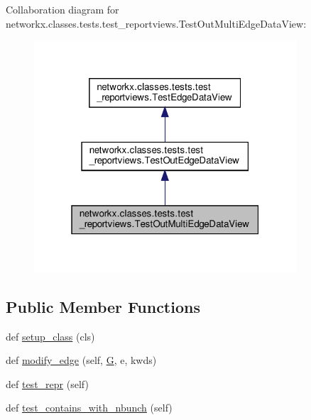 Collaboration diagram for networkx.\+classes.\+tests.\+test\+\_\+reportviews.\+Test\+Out\+Multi\+Edge\+Data\+View\+:
\nopagebreak
\begin{figure}[H]
\begin{center}
\leavevmode
\includegraphics[width=277pt]{classnetworkx_1_1classes_1_1tests_1_1test__reportviews_1_1TestOutMultiEdgeDataView__coll__graph}
\end{center}
\end{figure}
\subsection*{Public Member Functions}
\begin{DoxyCompactItemize}
\item 
def \hyperlink{classnetworkx_1_1classes_1_1tests_1_1test__reportviews_1_1TestOutMultiEdgeDataView_a45eb1b929a4416e8a45773122f7e4fe1}{setup\+\_\+class} (cls)
\item 
def \hyperlink{classnetworkx_1_1classes_1_1tests_1_1test__reportviews_1_1TestOutMultiEdgeDataView_ae1ee5acb335b86a3b3ff0a81222b2686}{modify\+\_\+edge} (self, \hyperlink{classnetworkx_1_1classes_1_1tests_1_1test__reportviews_1_1TestOutMultiEdgeDataView_a901cf3a487a2711aa46074c1e59cbc1e}{G}, e, kwds)
\item 
def \hyperlink{classnetworkx_1_1classes_1_1tests_1_1test__reportviews_1_1TestOutMultiEdgeDataView_adf21d1474abd6159faef8b1c6613f4a0}{test\+\_\+repr} (self)
\item 
def \hyperlink{classnetworkx_1_1classes_1_1tests_1_1test__reportviews_1_1TestOutMultiEdgeDataView_a622ba7a88c850c78915d8b536699180b}{test\+\_\+contains\+\_\+with\+\_\+nbunch} (self)
\end{DoxyCompactItemize}
